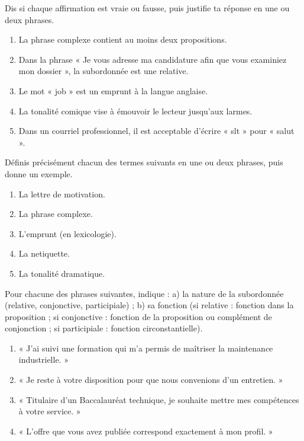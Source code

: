 \documentclass[11pt]{article}
\begin{document}
\begin{exercice}
Dis si chaque affirmation est vraie ou fausse, puis justifie ta réponse en une ou deux phrases.
\begin{enumerate}
\item La phrase complexe contient au moins deux propositions.
\item Dans la phrase « Je vous adresse ma candidature afin que vous examiniez mon dossier », la subordonnée est une relative.
\item Le mot « job » est un emprunt à la langue anglaise.
\item La tonalité comique vise à émouvoir le lecteur jusqu'aux larmes.
\item Dans un courriel professionnel, il est acceptable d'écrire « slt » pour « salut ».
\end{enumerate}
\end{exercice}

\begin{exercice}[Définitions]
Définis précisément chacun des termes suivants en une ou deux phrases, puis donne un exemple.
\begin{enumerate}
\item La lettre de motivation.
\item La phrase complexe.
\item L'emprunt (en lexicologie).
\item La netiquette.
\item La tonalité dramatique.
\end{enumerate}
\end{exercice}

\begin{exercice}
Pour chacune des phrases suivantes, indique : a) la nature de la subordonnée (relative, conjonctive, participiale) ; b) sa fonction (si relative : fonction dans la proposition ; si conjonctive : fonction de la proposition ou complément de conjonction ; si participiale : fonction circonstantielle).
\begin{enumerate}
\item « J'ai suivi une formation qui m'a permis de maîtriser la maintenance industrielle. »
\item « Je reste à votre disposition pour que nous convenions d'un entretien. »
\item « Titulaire d'un Baccalauréat technique, je souhaite mettre mes compétences à votre service. »
\item « L'offre que vous avez publiée correspond exactement à mon profil. »
\end{enumerate}
\end{exercice}
\end{document}
